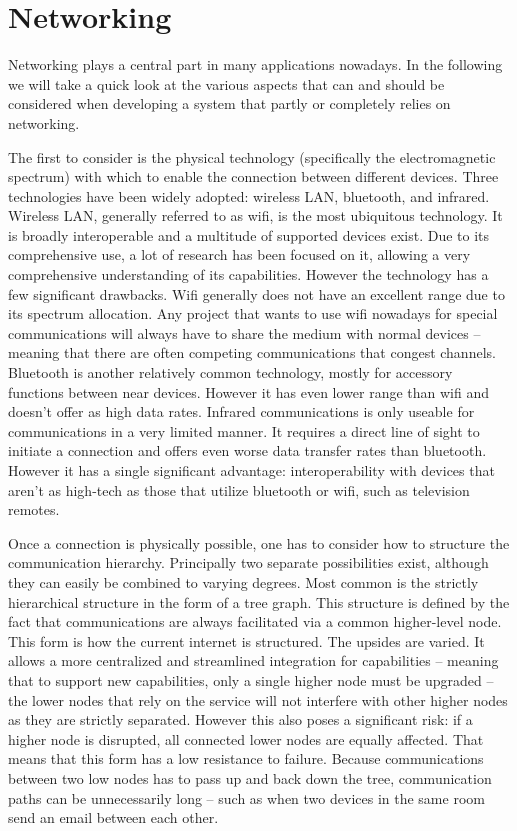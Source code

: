 \documentclass{acm_proc_article-sp}
\begin{document}
\section{Networking}

Networking plays a central part in many applications nowadays.
In the following we will take a quick look at the various aspects that can and should be considered when developing a system that partly or completely relies on networking.

The first to consider is the physical technology (specifically the electromagnetic spectrum) with which to enable the connection between different devices.
Three technologies have been widely adopted: wireless LAN, bluetooth, and infrared.
Wireless LAN, generally referred to as wifi, is the most ubiquitous technology.
It is broadly interoperable and a multitude of supported devices exist.
Due to its comprehensive use, a lot of research has been focused on it, allowing a very comprehensive understanding of its capabilities.
However the technology has a few significant drawbacks.
Wifi generally does not have an excellent range due to its spectrum allocation.
Any project that wants to use wifi nowadays for special communications will always have to share the medium with normal devices – meaning that there are often competing communications that congest channels.
Bluetooth is another relatively common technology, mostly for accessory functions between near devices.
However it has even lower range than wifi and doesn’t offer as high data rates.
Infrared communications is only useable for communications in a very limited manner.
It requires a direct line of sight to initiate a connection and offers even worse data transfer rates than bluetooth.
However it has a single significant advantage: interoperability with devices that aren’t as high-tech as those that utilize bluetooth or wifi, such as television remotes.

Once a connection is physically possible, one has to consider how to structure the communication hierarchy.
Principally two separate possibilities exist, although they can easily be combined to varying degrees.
Most common is the strictly hierarchical structure in the form of a tree graph.
This structure is defined by the fact that communications are always facilitated via a common higher-level node.
This form is how the current internet is structured.
The upsides are varied.
It allows a more centralized and streamlined integration for capabilities – meaning that to support new capabilities, only a single higher node must be upgraded – the lower nodes that rely on the service will not interfere with other higher nodes as they are strictly separated.
However this also poses a significant risk: if a higher node is disrupted, all connected lower nodes are equally affected.
That means that this form has a low resistance to failure.
Because communications between two low nodes has to pass up and back down the tree, communication paths can be unnecessarily long – such as when two devices in the same room send an email between each other.
\end{document}
